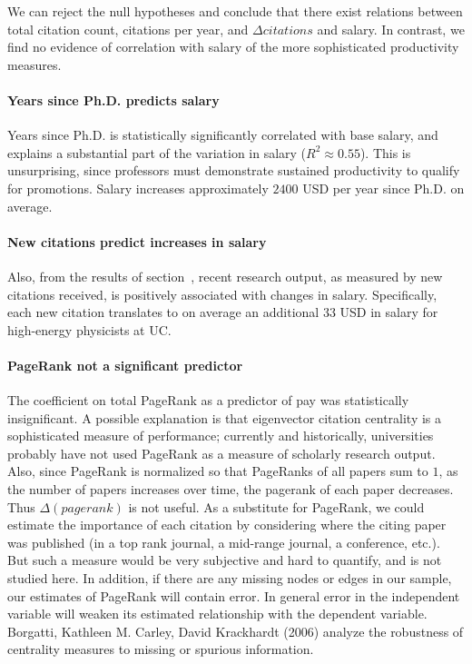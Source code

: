 We can reject the null hypotheses and conclude that there exist relations between total citation count, citations per year, and $\Delta citations$ and salary. In contrast, we find no evidence of correlation with salary of the more sophisticated productivity measures.

\paragraph{Years since Ph.D. predicts salary}
Years since Ph.D. is statistically significantly correlated with base salary, and explains a substantial part of the variation in salary ($R^2 \approx 0.55$). This is unsurprising, since professors must demonstrate sustained productivity to qualify for promotions. Salary increases approximately $2400$ USD per year since Ph.D. on average.

\paragraph{New citations predict increases in salary}
Also, from the results of section~, recent research output, as measured by new citations received, is positively associated with changes in salary. Specifically, each new citation translates to on average an additional $33$ USD in salary for high-energy physicists at UC.

\paragraph{PageRank not a significant predictor}
The coefficient on total PageRank as a predictor of pay was statistically insignificant. A possible explanation is that eigenvector citation centrality is a sophisticated measure of performance; currently and historically, universities probably have not used PageRank as a measure of scholarly research output. Also, since PageRank is normalized so that PageRanks of all papers sum to $1$, as the number of papers increases over time, the pagerank of each paper decreases. Thus $\Delta(pagerank)$ is not useful. As a substitute for PageRank, we could estimate the importance of each citation by considering where the citing paper was published (in a top rank journal, a mid-range journal, a conference, etc.). But such a measure would be very subjective and hard to quantify, and is not studied here. In addition, if there are any missing nodes or edges in our sample, our estimates of PageRank will contain error. In general error in the independent variable will weaken its estimated relationship with the dependent variable. Borgatti, Kathleen M. Carley, David Krackhardt (2006) analyze the robustness of centrality measures to missing or spurious information.

